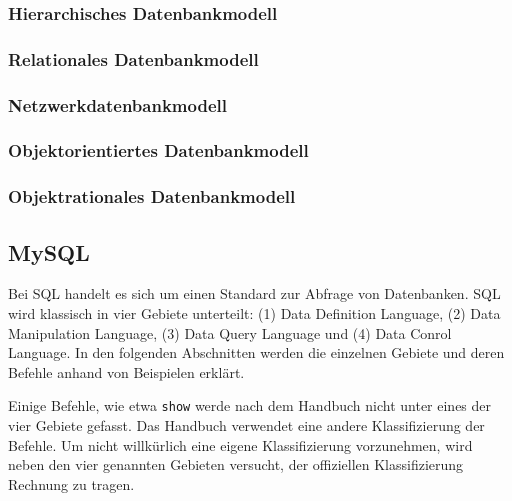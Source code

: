\subsubsection{Hierarchisches Datenbankmodell}

\subsubsection{Relationales Datenbankmodell}

\subsubsection{Netzwerkdatenbankmodell}

\subsubsection{Objektorientiertes Datenbankmodell}

\subsubsection{Objektrationales Datenbankmodell}


\subsection{MySQL}

Bei SQL handelt es sich um einen Standard zur Abfrage von Datenbanken. SQL wird klassisch in vier Gebiete unterteilt: (1) Data Definition Language, (2) Data Manipulation Language, (3) Data Query Language und (4) Data Conrol Language. In den folgenden Abschnitten werden die einzelnen Gebiete und deren Befehle anhand von Beispielen erklärt.

Einige Befehle, wie etwa \texttt{show} werde nach dem Handbuch nicht unter eines der vier Gebiete gefasst. Das Handbuch verwendet eine andere Klassifizierung der Befehle. Um nicht willkürlich eine eigene Klassifizierung vorzunehmen, wird neben den vier genannten Gebieten versucht, der offiziellen Klassifizierung Rechnung zu tragen.

